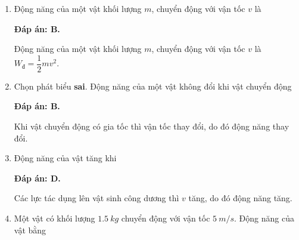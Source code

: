 \begin{enumerate}[label=\bfseries Câu \arabic*:, leftmargin=1.5cm]
	\item {}
	
	{
		Động năng của một vật khối lượng $m$, chuyển động với vận tốc $v$ là
	}
	
	\hideall
	{	
		\textbf{Đáp án: B.}
		
		Động năng của một vật khối lượng $m$, chuyển động với vận tốc $v$ là $W_\text{đ} = \dfrac{1}{2}mv^2$.
	}
	\item {}
	
	{
		Chọn phát biểu \textbf{sai}. Động năng của một vật không đổi khi vật chuyển động
	}
	
	\hideall
	{	
		\textbf{Đáp án: B.}
		
		Khi vật chuyển động có gia tốc thì vận tốc thay đổi, do đó động năng thay đổi.
	}
	\item {}
	
	
	{
		Động năng của vật tăng khi
	}
	
	\hideall
	{	
		\textbf{Đáp án: D.}
		
		Các lực tác dụng lên vật sinh công dương thì $v$ tăng, do đó động năng tăng.
	}
	\item {}
	
	
	{
		Một vật có khối lượng $\SI{1.5}{kg}$ chuyển động với vận tốc $\SI{5}{m/s}$. Động năng của vật bằng
	}
	

\end{enumerate}
